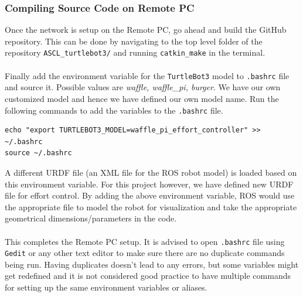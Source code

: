 \documentclass[12]{article}
\begin{document}
\subsubsection{Compiling Source Code on Remote PC}
Once the network is setup on the Remote PC, go ahead and build the GitHub repository. This can be done by navigating to the top level folder of the repository \texttt{ASCL\_turtlebot3/} and running \texttt{catkin\_make} in the terminal.\\\\
Finally add the environment variable for the \texttt{TurtleBot3} model to \texttt{.bashrc} file and source it. Possible values are \textit{waffle, waffle\_pi, burger}. We have our own customized model and hence we have defined our own model name. Run the following commands to add the variables to the \texttt{.bashrc} file.
\begin{lstlisting}[style=bash]
echo "export TURTLEBOT3_MODEL=waffle_pi_effort_controller" >> ~/.bashrc
source ~/.bashrc
\end{lstlisting}
A different URDF file (an XML file for the ROS robot model) is loaded based on this environment variable. For this project however, we have defined new URDF file for effort control. By adding the above environment variable, ROS would use the appropriate file to model the robot for visualization and take the appropriate geometrical dimensions/parameters in the code.\\\\
This completes the Remote PC setup. It is advised to open \texttt{.bashrc} file using \texttt{Gedit} or any other text editor to make sure there are no duplicate commands being run. Having duplicates doesn't lead to any errors, but some variables might get redefined and it is not considered good practice to have multiple commands for setting up the same environment variables or aliases.
\end{document}
